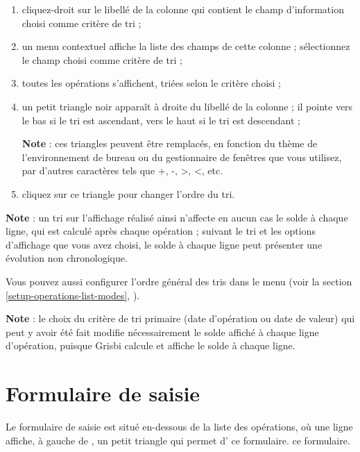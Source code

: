\begin{enumerate}
	  \item cliquez-droit sur le libellé de la colonne qui contient le champ d'information choisi comme critère de \gls{tri} ;
	  \item un menu contextuel affiche la liste des champs de cette colonne ; 	sélectionnez le champ choisi comme critère de tri ;
	  \item toutes les opérations s'affichent, triées selon le critère choisi ;
	  \item un petit triangle noir apparaît à droite du libellé de la colonne ; il pointe vers le bas si le tri est ascendant, vers le haut si le tri est descendant ;

	  \textbf{Note} : ces triangles peuvent être remplacés, en fonction du thème de l'environnement de bureau ou du gestionnaire de fenêtres que vous utilisez, par d'autres caractères tels que +, -, >, <, etc.
	  \item cliquez sur ce triangle pour changer l'ordre du tri.
\end{enumerate}

\textbf{Note} : un tri sur l'affichage réalisé ainsi n'affecte en aucun cas le solde à chaque ligne, qui est calculé après chaque opération ; suivant le tri et les options d'affichage que vous avez choisi, le solde à chaque ligne peut présenter une évolution non chronologique. 

Vous pouvez aussi configurer l'ordre général des tris dans le menu  (voir la section \vref{setup-operations-list-modes}, ).

\textbf{Note} : le choix du critère de \gls{tri primaire} (date d'opération ou date de valeur) qui peut y avoir été fait modifie nécessairement le solde affiché à chaque ligne d'opération, puisque Grisbi calcule et affiche le solde à chaque ligne.


\section{Formulaire de saisie\label{transactions-form}}


Le formulaire de saisie est situé en-dessous de la liste des opérations, où une ligne affiche, à gauche de , un petit triangle qui  permet d' \ifIllustration ce formulaire.
\else ce formulaire.
\fi


